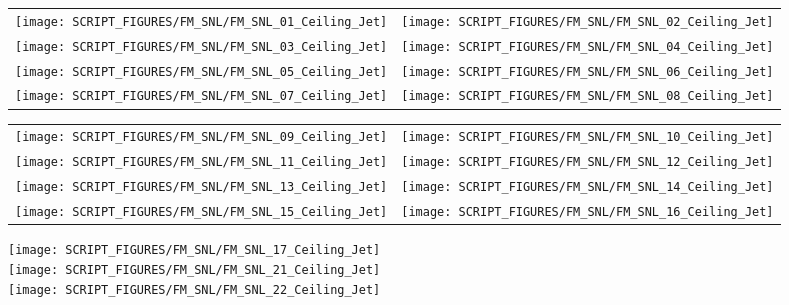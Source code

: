 \begin{figure}[p]
\begin{tabular*}{\textwidth}{l@{\extracolsep{\fill}}r}
\texttt{[image: SCRIPT\_FIGURES/FM\_SNL/FM\_SNL\_01\_Ceiling\_Jet]} &
\texttt{[image: SCRIPT\_FIGURES/FM\_SNL/FM\_SNL\_02\_Ceiling\_Jet]} \\
\texttt{[image: SCRIPT\_FIGURES/FM\_SNL/FM\_SNL\_03\_Ceiling\_Jet]} &
\texttt{[image: SCRIPT\_FIGURES/FM\_SNL/FM\_SNL\_04\_Ceiling\_Jet]} \\
\texttt{[image: SCRIPT\_FIGURES/FM\_SNL/FM\_SNL\_05\_Ceiling\_Jet]} &
\texttt{[image: SCRIPT\_FIGURES/FM\_SNL/FM\_SNL\_06\_Ceiling\_Jet]} \\
\texttt{[image: SCRIPT\_FIGURES/FM\_SNL/FM\_SNL\_07\_Ceiling\_Jet]} &
\texttt{[image: SCRIPT\_FIGURES/FM\_SNL/FM\_SNL\_08\_Ceiling\_Jet]}
\end{tabular*}
\end{figure}

\begin{figure}[p]
\begin{tabular*}{\textwidth}{l@{\extracolsep{\fill}}r}
\texttt{[image: SCRIPT\_FIGURES/FM\_SNL/FM\_SNL\_09\_Ceiling\_Jet]} &
\texttt{[image: SCRIPT\_FIGURES/FM\_SNL/FM\_SNL\_10\_Ceiling\_Jet]} \\
\texttt{[image: SCRIPT\_FIGURES/FM\_SNL/FM\_SNL\_11\_Ceiling\_Jet]} &
\texttt{[image: SCRIPT\_FIGURES/FM\_SNL/FM\_SNL\_12\_Ceiling\_Jet]} \\
\texttt{[image: SCRIPT\_FIGURES/FM\_SNL/FM\_SNL\_13\_Ceiling\_Jet]} &
\texttt{[image: SCRIPT\_FIGURES/FM\_SNL/FM\_SNL\_14\_Ceiling\_Jet]} \\
\texttt{[image: SCRIPT\_FIGURES/FM\_SNL/FM\_SNL\_15\_Ceiling\_Jet]} &
\texttt{[image: SCRIPT\_FIGURES/FM\_SNL/FM\_SNL\_16\_Ceiling\_Jet]}
\end{tabular*}
\end{figure}

\begin{figure}[p]
\begin{center}
\texttt{[image: SCRIPT\_FIGURES/FM\_SNL/FM\_SNL\_17\_Ceiling\_Jet]} \\
\texttt{[image: SCRIPT\_FIGURES/FM\_SNL/FM\_SNL\_21\_Ceiling\_Jet]} \\
\texttt{[image: SCRIPT\_FIGURES/FM\_SNL/FM\_SNL\_22\_Ceiling\_Jet]}
\end{center}
\end{figure}

